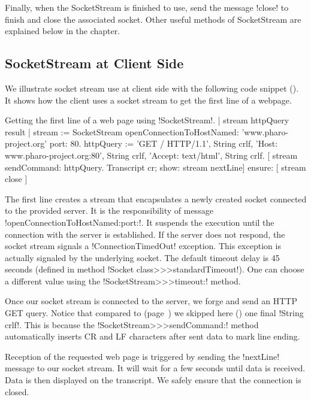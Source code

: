 \documentclass[a4paper,10pt,twoside]{book}
\begin{document}
Finally, when the SocketStream is finished to use, send the message \ct!close! to finish and close the associated socket. Other useful methods of SocketStream are explained below in the chapter.

\subsection{SocketStream at Client Side}
We illustrate socket stream use at client side with the following code snippet ().
It shows how the client uses a socket stream to get the first line of a webpage.

\begin{script}{Getting the first line of a web page using \ct!SocketStream!.}
	| stream httpQuery result |
	stream := SocketStream 
			openConnectionToHostNamed: 'www.pharo-project.org' 
			port: 80.
	httpQuery := 'GET / HTTP/1.1', String crlf, 
		'Host: www.pharo-project.org:80', String crlf, 
		'Accept: text/html', String crlf.
	[ stream sendCommand: httpQuery.
	Transcript cr; show: stream nextLine] ensure: [ stream close ]
\end{script}

The first line creates a stream that encapsulates a newly created socket connected to the provided server.
It is the responsibility of message \ct!openConnectionToHostNamed:port:!.
It suspends the execution until the connection with the server is established.
If the server does not respond, the socket stream signals a \ct!ConnectionTimedOut! exception.
This exception is actually signaled by the underlying socket.
The default timeout delay is 45 seconds (defined in method \ct!Socket class>>>standardTimeout!).
One can choose a different value using the \ct!SocketStream>>>timeout:! method.

Once our socket stream is connected to the server, we forge and send an HTTP GET query.
Notice that compared to  (page~\pageref{scr:script:closeAndDestroy}) we skipped here () one final \ct!String crlf!.
This is because the \ct!SocketStream>>>sendCommand:! method automatically inserts CR and LF characters after sent data to mark line ending.

Reception of the requested web page is triggered by sending the \ct!nextLine! message to our socket stream.
It will wait for a few seconds until data is received.
Data is then displayed on the transcript.
We safely ensure that the connection is closed.
\end{document}
